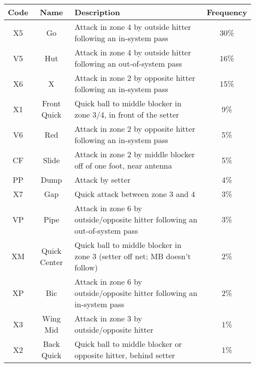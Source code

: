 \begin{tabular}{c|clc}
  Code  & Name & Description & Frequency\\
  \hline
  X5    & Go            & Attack in zone 4 by outside hitter following an in-system pass              & 30\%\\
  V5    & Hut           & Attack in zone 4 by outside hitter following an out-of-system pass          & 16\%\\
  X6    & X             & Attack in zone 2 by opposite hitter following an in-system pass             & 15\%\\
  X1    & Front Quick   & Quick ball to middle blocker in zone 3/4, in front of the setter            & 9\%\\
  V6    & Red           & Attack in zone 2 by opposite hitter following an in-system pass             & 5\%\\
  CF    & Slide         & Attack in zone 2 by middle blocker off of one foot, near antenna            & 5\%\\
  PP    & Dump          & Attack by setter                                                            & 4\%\\
  X7    & Gap           & Quick attack between zone 3 and 4                                           & 3\%\\
  VP    & Pipe          & Attack in zone 6 by outside/opposite hitter following an out-of-system pass           & 3\%\\
  XM    & Quick Center  & Quick ball to middle blocker in zone 3 (setter off net; MB doesn't follow)  & 2\%\\
  XP    & Bic           & Attack in zone 6 by outside/opposite hitter following an in-system pass               & 2\%\\
  X3    & Wing Mid      & Attack in zone 3 by outside/opposite hitter                              & 1\%\\
  X2    & Back Quick    & Quick ball to middle blocker or opposite hitter, behind setter              & 1\%\\
\end{tabular}